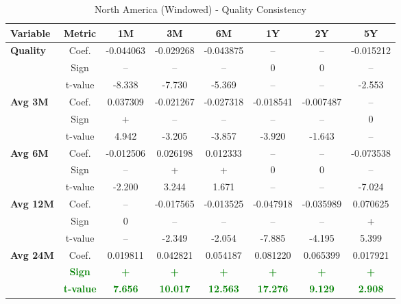 \documentclass[11pt,english,a4paper,hidelinks]{book}
\begin{document}
\begin{table}[H]
    \centering
    \caption{North America (Windowed) - Quality Consistency}
    \begin{tabular}{lccccccc}
        \toprule
        \textbf{Variable} & \textbf{Metric} & \textbf{1M} & \textbf{3M} & \textbf{6M} & \textbf{1Y} & \textbf{2Y} & \textbf{5Y} \\
        \midrule
        \multirow{3}{*}{\textbf{Quality}}
            & Coef.   & -0.044063 & -0.029268 & -0.043875 & --        & --        & -0.015212 \\
            & Sign    & –         & –         & –         & 0         & 0         & –         \\
            & t-value & -8.338    & -7.730    & -5.369    & --        & --        & -2.553    \\
        \cmidrule{1-8}
        \multirow{3}{*}{\textbf{Avg 3M}}
            & Coef.   & 0.037309  & -0.021267 & -0.027318 & -0.018541 & -0.007487 & --        \\
            & Sign    & +         & –         & –         & –         & –         & 0         \\
            & t-value & 4.942     & -3.205    & -3.857    & -3.920    & -1.643    & --        \\
        \cmidrule{1-8}
        \multirow{3}{*}{\textbf{Avg 6M}}
            & Coef.   & -0.012506 & 0.026198  & 0.012333  & --        & --        & -0.073538 \\
            & Sign    & –         & +         & +         & 0         & 0         & –         \\
            & t-value & -2.200    & 3.244     & 1.671     & --        & --        & -7.024    \\
        \cmidrule{1-8}
        \multirow{3}{*}{\textbf{Avg 12M}}
            & Coef.   & --        & -0.017565 & -0.013525 & -0.047918 & -0.035989 & 0.070625  \\
            & Sign    & 0         & –         & –         & –         & –         & +         \\
            & t-value & --        & -2.349    & -2.054    & -7.885    & -4.195    & 5.399     \\
        \cmidrule{1-8}
        \multirow{3}{*}{\textbf{Avg 24M}}
            & Coef.   & 0.019811  & 0.042821  & 0.054187  & 0.081220  & 0.065399  & 0.017921  \\
            & \textbf{\textcolor{green}{Sign}}    & \textbf{\textcolor{green}{+}}         & \textbf{\textcolor{green}{+}}         & \textbf{\textcolor{green}{+}}         & \textbf{\textcolor{green}{+}}         & \textbf{\textcolor{green}{+}}         & \textbf{\textcolor{green}{+}}         \\
            & \textbf{\textcolor{green}{t-value}} & \textbf{\textcolor{green}{7.656}}     & \textbf{\textcolor{green}{10.017}}    & \textbf{\textcolor{green}{12.563}}    & \textbf{\textcolor{green}{17.276}}    & \textbf{\textcolor{green}{9.129}}     & \textbf{\textcolor{green}{2.908}}     \\
        \bottomrule
    \end{tabular}
    \label{tab:north_america_quality_consistency}
\end{table}
\end{document}

